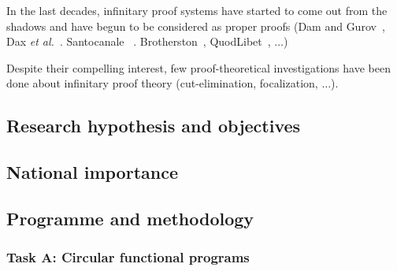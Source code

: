 In the last decades, infinitary proof systems have started to come out from the shadows and have begun to be considered as proper proofs (Dam and Gurov~,  Dax \textit{et al.}~. Santocanale ~. Brotherston~\citebiblio{}, QuodLibet~, $\dots$)

\medskip
Despite their compelling interest,
few proof-theoretical investigations have been done about infinitary proof theory (cut-elimination, focalization, $\dots$).




\subsection{Research hypothesis and objectives}

\subsection{National importance}

\subsection{Programme and methodology}

\subsubsection{Task A: Circular functional programs}

